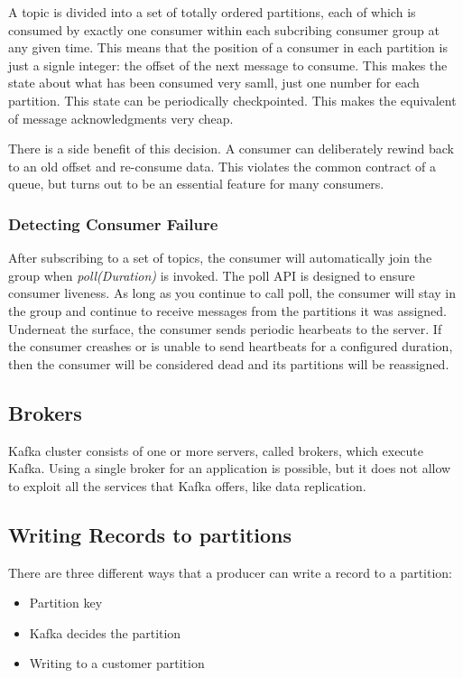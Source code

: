 A topic is divided into a set of totally ordered partitions, each of which is
consumed by exactly one consumer within each subcribing consumer group at any
given time.
This means that the position of a consumer in each partition is just a signle
integer: the offset of the next message to consume.
This makes the state about what has been consumed very samll, just one number
for each partition. This state can be periodically checkpointed. This makes the
equivalent of message acknowledgments very cheap.

There is a side benefit of this decision. A consumer can deliberately rewind
back to an old offset and re-consume data. This violates the common contract of
a queue, but turns out to be an essential feature for many consumers.

\subsubsection{Detecting Consumer Failure}

After subscribing to a set of topics, the consumer will automatically join the
group when \textit{poll(Duration)} is invoked.
The poll API is designed to ensure consumer liveness. As long as you continue
to call poll, the consumer will stay in the group and continue to receive
messages from the partitions it was assigned. Underneat the surface, the
consumer sends periodic hearbeats to the server. If the consumer creashes or is
unable to send heartbeats for a configured duration, then the consumer will be
considered dead and its partitions will be reassigned.

\subsection{Brokers}

Kafka cluster consists of one or more servers, called brokers, which execute
Kafka. Using a single broker for an application is possible, but it does not
allow to exploit all the services that Kafka offers, like data replication.

\subsection{Writing Records to partitions}

There are three different ways that a producer can write a record to a
partition:

\begin{itemize}
    \item   Partition key
    \item   Kafka decides the partition
    \item   Writing to a customer partition
\end{itemize}

